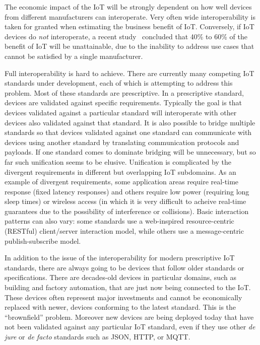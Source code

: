 The economic impact of the IoT will be strongly dependent on how well devices from 
different manufacturers can interoperate.
Very often wide interoperability is taken for granted when estimating the business
benefit of IoT. 
Conversely, if IoT devices do \emph{not} interoperate,
a recent study~\cite{McK2015a} concluded that 40\% to 60\% of the 
benefit of IoT will be unattainable,
due to the inability to address use cases that cannot be satisfied by a single manufacturer.

Full interoperability is hard to achieve.
There are currently many competing IoT standards under development,
each of which is attempting to address this problem.
Most of these standards are prescriptive.
In a prescriptive standard,
devices are validated against specific requirements.
Typically the goal is that devices validated against 
a particular standard will interoperate with
other devices also validated against that standard.
It is also possible to bridge multiple standards so that
devices validated against one standard can communicate with
devices using another standard by translating communication protocols and payloads.
If one standard comes to dominate bridging will be unnecessary,
but so far such unification seems to be elusive. 
Unification is complicated by the
divergent requirements in different but overlapping IoT subdomains.
As an example of divergent requirements,
some application areas require real-time response (fixed latency responses)
and others require low power (requiring long sleep times) or wireless access
(in which it is very difficult to acheive real-time guarantees due to the
possibility of interference or collisions).
Basic interaction patterns can also vary: some standards use
a web-inspired resource-centric (RESTful) client/server interaction model,
while others use a message-centric publish-subscribe model.

In addition to the issue of the interoperability for modern prescriptive IoT standards,
there are always going to be devices that follow older standards or specifications.
There are decades-old devices in particular domains, such as building and factory
automation, that are just now being connected to the IoT.
These devices often represent major investments and cannot be economically replaced with newer,
devices conforming to the latest standard.
This is the ``brownfield'' problem.
Moreover new devices are being deployed today that have not been validated
against any particular IoT standard,
even if they use other \textit{de jure} or \textit{de facto} standards such as JSON, HTTP, or MQTT.

